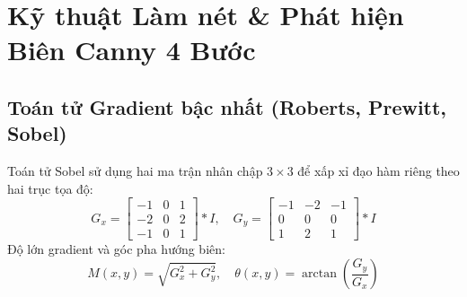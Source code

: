 \section{Kỹ thuật Làm nét \& Phát hiện Biên Canny 4 Bước}
\subsection{Toán tử Gradient bậc nhất (Roberts, Prewitt, Sobel)}
Toán tử Sobel sử dụng hai ma trận nhân chập $3 \times 3$ để xấp xỉ đạo hàm riêng theo hai trục tọa độ:
\begin{equation}
G_x = \begin{bmatrix} -1 & 0 & 1 \\ -2 & 0 & 2 \\ -1 & 0 & 1 \end{bmatrix} * I, \quad
G_y = \begin{bmatrix} -1 & -2 & -1 \\ 0 & 0 & 0 \\ 1 & 2 & 1 \end{bmatrix} * I
\label{eq:sobel_kernel}
\end{equation}
Độ lớn gradient và góc pha hướng biên:
\begin{equation}
M(x, y) = \sqrt{G_x^2 + G_y^2}, \quad \theta(x, y) = \arctan\left(\frac{G_y}{G_x}\right)
\label{eq:mag_angle}
\end{equation}

